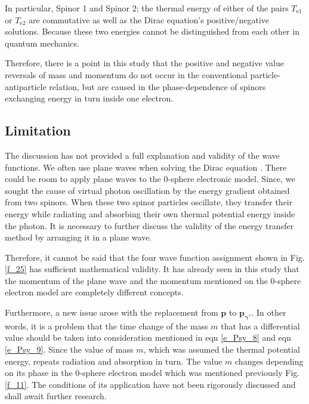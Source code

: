 \documentclass[%
 reprint,
 amsmath,amssymb,
 aps,
]{revtex4-1}
\numberwithin{equation}{section}%
\begin{document}
    In particular, Spinor 1 and Spinor 2; the thermal energy of either of the pairs $T_{\mathrm{e1}}$ or $T_{\mathrm{e2}}$ are commutative as well as the Dirac equation's positive/negative solutions. Because these two energies cannot be distinguished from each other in quantum mechanics.

    Therefore, there is a point in this study that the positive and negative value reversals of mass and momentum do not occur in the conventional particle-antiparticle relation, but are caused in the phase-dependence of spinors exchanging energy in turn inside one electron.




\subsection{
    \label{sec:Limitation}
        Limitation}

    The discussion has not provided a full explanation and validity of the wave functions. We often use plane waves when solving the Dirac equation \cite{J.J.Sakurai}. There could be room to apply plane waves to the 0-sphere electronic model. Since, we sought the cause of virtual photon oscillation by the energy gradient obtained from two spinors. When these two spinor particles oscillate, they transfer their energy while radiating and absorbing their own thermal potential energy inside the photon. It is necessary to further discuss the validity of the energy transfer method by arranging it in a plane wave.
    
    Therefore, it cannot be said that the four wave function assignment shown in Fig. \ref{f_25} has sufficient mathematical validity. It has already seen in this study that the momentum of the plane wave and the momentum mentioned on the 0-sphere electron model are completely different concepts.

    Furthermore, a new issue arose with the replacement from $\bm{p}$ to $\bm{p_{\gamma^{*}}}$. In other words, it is a problem that the time change of the mass $m$ that has a differential value should be taken into consideration mentioned in eqn \ref{e_Psy_8} and eqn \ref{e_Psy_9}. Since the value of mass $m$, which was assumed the thermal potential energy, repeats radiation and absorption in turn. The value $m$ changes depending on its phase in the 0-sphere electron model which was mentioned previously Fig. \ref{f_11}. The conditions of its application have not been rigorously discussed and shall await further research.
\end{document}
